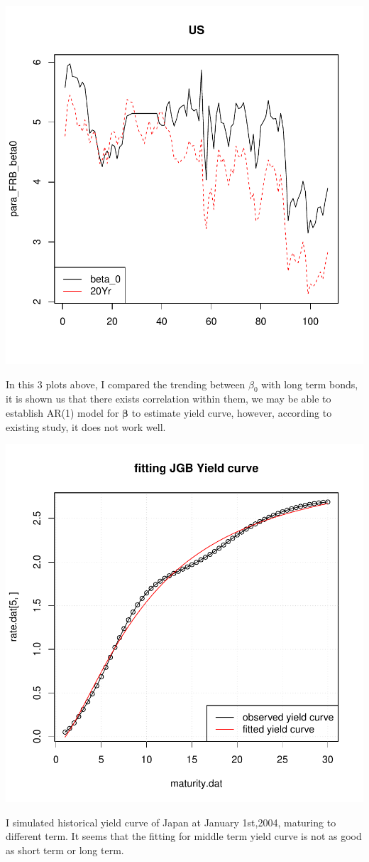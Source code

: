 \documentclass{article}
\begin{document}
\begin{spacing}{1.5}
\begin{center}
\includegraphics{Graduation_Paper-022}
\end{center}

In this 3 plots above, I compared the trending between $\beta_0$ with long term bonds, it is shown us that there exists correlation within them, we may be able to  establish AR(1) model for $\mathbf{\beta}$ to estimate yield curve, however, according to existing study, it does not work well.


\begin{center}
\includegraphics{Graduation_Paper-024}
\end{center}
I simulated historical yield curve of Japan at January 1st,2004, maturing to different term. It seems that the fitting for middle term yield curve is not as good as short term or long term.


\end{spacing}
\end{document}
